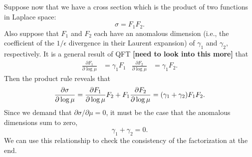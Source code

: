\documentclass[11pt,twoside,reqno]{amsart}
\theoremstyle{plain}
\theoremstyle{remark}
\theoremstyle{definition}
\theoremstyle{remark}
\theoremstyle{definition}
\theoremstyle{definition}
\begin{document}
	Suppose now that we have a cross section which is the product of two functions in Laplace space:
	\begin{equation}
		\sigma = F_1 F_2.
	\end{equation}
	Also suppose that $F_1$ and $F_2$ each have an anomalous dimension (i.e., the coefficient of the $1/\epsilon$ divergence in their Laurent expansion) of $\gamma_1$ and $\gamma_2$, respectively. It is a general result of QFT {\color{red}\textbf{[need to look into this more]}} that \cite{frye_factorization_2016}
	\begin{align}
		\frac{\partial F_1}{\partial \log \mu} &= \gamma_1 F_1 & \frac{\partial F_2}{\partial \log \mu} &= \gamma_1 F_2.
	\end{align}
	Then the product rule reveals that
	\begin{equation}
		\frac{\partial \sigma}{\partial \log \mu} = \frac{\partial F_1}{\partial \log \mu}F_2 + F_1 \frac{\partial F_2}{\partial \log \mu} = \qty(\gamma_1 + \gamma_2) F_1 F_2.
	\end{equation}
	Since we demand that $\partial \sigma /\partial \mu = 0$, it must be the case that the anomalous dimensions sum to zero,
	\begin{equation}
		\gamma_1 + \gamma_2 = 0.
	\end{equation}
	We can use this relationship to check the consistency of the factorization at the end.
\end{document}
